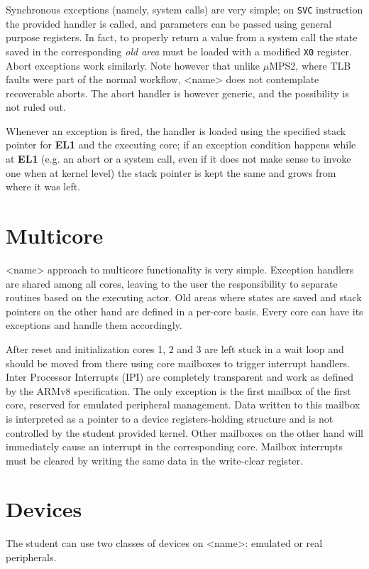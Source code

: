 \documentclass[12pt,a4paper,openright,twoside]{report}
\begin{document}
Synchronous exceptions (namely, system calls) are very simple; on {\tt SVC} 
instruction the provided handler is called, and parameters can be passed using
general purpose registers. In fact, to properly return a value from a system call
the state saved in the corresponding \textit{old area} must be loaded with a modified 
{\tt X0} register.\\

Abort exceptions work similarly. Note however that unlike $\mu$MPS2, where TLB
faults were part of the normal workflow, <name> does not contemplate recoverable
aborts. The abort handler is however generic, and the possibility is not ruled
out.

Whenever an exception is fired, the handler is loaded using the specified stack
pointer for \textbf{EL1} and the executing core; if an exception condition happens
while at \textbf{EL1} (e.g. an abort or a system call, even if it does not make 
sense to invoke one when at kernel level) the stack pointer is kept the same
and grows from where it was left.

\section{Multicore}
<name> approach to multicore functionality is very simple. Exception handlers 
are shared among all cores, leaving to the user the responsibility to separate
routines based on the executing actor. Old areas where states are saved and stack
pointers on the other hand are defined in a per-core basis. Every core can have
its exceptions and handle them accordingly.

After reset and initialization cores 1, 2 and 3 are left stuck in a wait loop and
should be moved from there using core mailboxes to trigger interrupt handlers.
Inter Processor Interrupts (IPI) are completely transparent and work as defined
by the ARMv8 specification. The only exception is the first mailbox of the first
core, reserved for emulated peripheral management. Data written to this mailbox
is interpreted as a pointer to a device registers-holding structure and is not
controlled by the student provided kernel.
Other mailboxes on the other hand will immediately cause an interrupt in the
corresponding core. Mailbox interrupts must be cleared by writing the same data
in the write-clear register.

\section{Devices}
The student can use two classes of devices on <name>: emulated or real peripherals.
\end{document}
